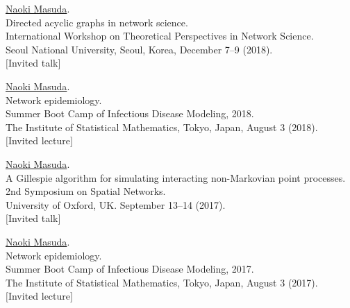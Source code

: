\documentclass[11pt,letter]{article}
\begin{document}
\begin{etaremune}
\item \underline{Naoki Masuda}.\\
Directed acyclic graphs in network science.\\
International Workshop on Theoretical Perspectives in Network Science.\\
Seoul National University, Seoul, Korea, December 7--9 (2018).\\
$[$Invited talk$]$

\item \underline{Naoki Masuda}.\\
Network epidemiology.\\
Summer Boot Camp of Infectious Disease Modeling, 2018.\\
The Institute of Statistical Mathematics, Tokyo, Japan, August 3 (2018).\\
$[$Invited lecture$]$


\item \underline{Naoki Masuda}.\\
A Gillespie algorithm for simulating interacting non-Markovian point processes.\\
2nd Symposium on Spatial Networks.\\
University of Oxford, UK. September 13--14 (2017).\\
$[$Invited talk$]$

\item \underline{Naoki Masuda}.\\
Network epidemiology.\\
Summer Boot Camp of Infectious Disease Modeling, 2017.\\
The Institute of Statistical Mathematics, Tokyo, Japan, August 3 (2017).\\
$[$Invited lecture$]$


\end{etaremune}
\end{document}
